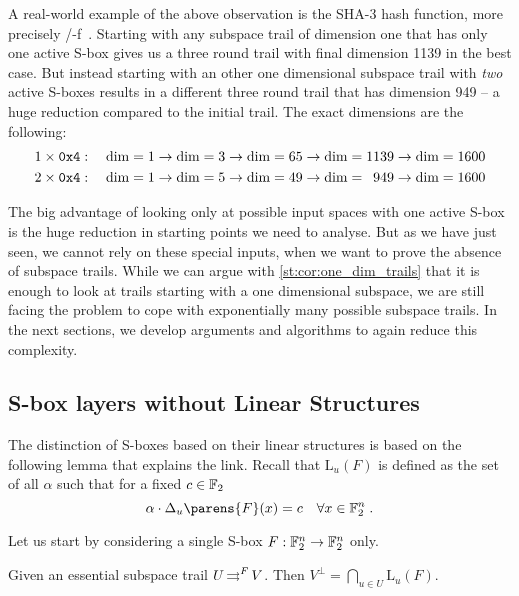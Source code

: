 \begin{example}
A real-world example of the above observation is the SHA-3 hash function, more precisely \keccak/-f~\cite{keccak,FIPS:SHA3}.
Starting with any subspace trail of dimension one that has only one active S-box gives us a three round trail with final dimension 1139 in the best case.
But instead starting with an other one dimensional subspace trail with \emph{two} active S-boxes results in a different three round trail that has dimension 949 -- a huge reduction compared to the initial trail.
The exact dimensions are the following:
\begin{align*}
    1\times \mathtt{0x4} &:\quad \mathrm{dim} = 1 \rightarrow \mathrm{dim} = 3 \rightarrow \mathrm{dim} = 65 \rightarrow \mathrm{dim} = 1139 \rightarrow \mathrm{dim} = 1600 \\
    2\times \mathtt{0x4} &:\quad \mathrm{dim} = 1 \rightarrow \mathrm{dim} = 5 \rightarrow \mathrm{dim} = 49 \rightarrow \mathrm{dim} = \hphantom{0}949 \rightarrow \mathrm{dim} = 1600
\end{align*}
\end{example}

The big advantage of looking only at possible input spaces with one active S-box is the huge reduction in starting points we need to analyse.
But as we have just seen, we cannot rely on these special inputs, when we want to prove the absence of subspace trails.
While we can argue with \cref{st:cor:one_dim_trails} that it is enough to look at trails starting with a one dimensional subspace, we are still facing the problem to cope with exponentially many possible subspace trails.
In the next sections, we develop arguments and algorithms to again reduce this complexity.

\subsection{S-box layers without Linear Structures}\label{sec:st:algorithm1}

The distinction of S-boxes based on their linear structures is based on the following lemma that explains the link.
Recall that $\mathrm{L}_u(F)$ is defined as the set of all $\alpha$ such that for a fixed $ c \in \mathbb{F}_2$
\begin{equation*}
    \iprod{\alpha}{\Delta_{u}\parens{F}(x)} = c \quad \forall x \in \F_2^n\;.
\end{equation*}

Let us start by considering a single S-box $F:\mathbb{F}_2^n \to \mathbb{F}_2^n$ only.
\begin{lemma}\label{st:lem:vperp_subtrail}
    Given an essential subspace trail $U \operatorname*{\rightrightarrows}^{F}_{} V$.
    Then $V^\perp = \displaystyle\bigcap_{u \in U} \mathrm{L}_{u}(F)$.
\end{lemma}

